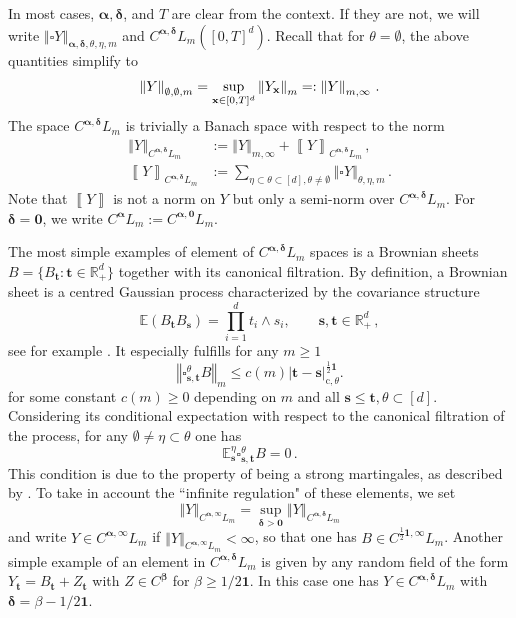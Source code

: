 \documentclass[12pt]{article}
\numberwithin{equation}{section}
\theoremstyle{plain}
\theoremstyle{definition}
\newcommand{\abs}[1]{\left\vert #1 \right\vert}
\newcommand{\bracket}[1]{\left\llbracket #1 \right\rrbracket}
\newcommand{\norm}[1]{\left\Vert #1\right\Vert}
\def\bR{\mathbb{R}}\def\bS{\mathbb{S}}
\def\bE{\mathbb{E}}\def\bW{\mathbb{W}}
\def\fs{\mathbf s}\def\ft{\mathbf t}
\def\falpha{{\boldsymbol\alpha}}
\def\fbeta{{\boldsymbol\beta}}
\def\fdelta{{\boldsymbol\delta}}
\def\foo{{\boldsymbol 0}}
\def\fone{{\boldsymbol 1}}
\begin{document}
 In most cases, $\falpha,\fdelta$, and $T$ are clear from the context. If they are not, we will write $\norm{\square Y}_{\falpha,\fdelta,\theta,\eta,m}$ and $C^{\falpha,\fdelta}L_m([0,T]^d)$. Recall that for $\theta = \emptyset$, the above quantities simplify to
\begin{equation*}
\norm{Y}_{\emptyset,\emptyset,m} = \sup_{\fx\in [0,T]^d}\norm{Y_\fx}_m  =:\norm{Y}_{m,\infty}\,.  
\end{equation*}
The space $C^{\falpha,\fdelta}L_m$ is trivially a Banach space with respect to the norm
\begin{align*}
    \norm{Y}_{C^{\falpha,\fdelta}L_m} &:= \norm{Y}_{m,\infty}+\bracket{Y}_{C^{\falpha,\fdelta}L_m}\,, \\ \bracket{Y}_{C^{\falpha,\fdelta}L_m} &:= \sum_{\eta\subset\theta\subset[d],\theta\neq\emptyset} \norm{\square Y}_{\theta,\eta,m}\,.
\end{align*}
Note that $\bracket{Y}$ is not a norm on $Y$ but only a semi-norm over $C^{\falpha,\fdelta}L_m$. For $\fdelta = \foo$, we write $C^{\falpha} L_m := C^{\falpha,\foo}L_m$. 

 The most simple examples of element of $C^{\falpha,\fdelta}L_m$ spaces is a Brownian sheets $B=\{B_\ft \colon \ft\in\bR_+^d\}$ together with its canonical  filtration. By definition, a Brownian sheet is a centred Gaussian process characterized by the covariance structure
\[
    \bE(B_\ft B_\fs) = \prod_{i=1}^d t_i\wedge s_i,\qquad \fs,\ft\in\bR^d_+\,,
\]
see for example \cite{Khoshnevisan02,Cairoli1975}. It especially fulfills for any $m\ge 1$
\begin{equation*}
    \norm{\square^\theta_{\fs,\ft} B}_m \le c(m)\abs{\ft-\fs}_{\text{c},\theta}^{\frac 12 \fone}.
\end{equation*}
for some constant $c(m)\geq 0$ depending on $m$ and all $\fs\le\ft,\theta\subset[d]$. Considering its conditional expectation with respect to the canonical filtration of the process, for any $\emptyset\neq\eta\subset\theta$ one has 
\begin{equation*}
    \bE^\eta_\fs \square^\theta_{\fs,\ft} B = 0\,.
\end{equation*}
This condition is due to the property of being a strong martingales, as described by \cite{Imkeller85,walsh1986}. To take in account the ``infinite regulation" of these elements,  we set
\[\norm{Y}_{C^{\falpha,\infty}L_m} = \sup_{\fdelta>\foo} \norm{Y}_{C^{\falpha,\fdelta}L_m}\]
and write $Y\in C^{\falpha,\infty} L_m$ if $\norm{Y}_{C^{\falpha,\infty}L_m}<\infty$, so that one has $B\in C^{\frac 12\fone,\infty} L_m$. Another simple example of an element in $C^{\falpha,\fdelta}L_m$ is given by any random field of the form $Y_{\ft}=B_{\ft}+ Z_{\ft}$ with $Z\in C^\fbeta$ for  $\beta\geq 1/2\fone $. In this case one has $Y\in C^{\falpha,\fdelta}L_m$ with  $\fdelta = \beta- 1/2\fone$. 
\end{document}
